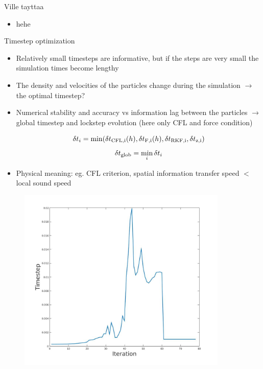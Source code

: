 \documentclass{beamer}
\begin{document}
\begin{frame}{Ville tayttaa}
\begin{itemize}

\item hehe

\end{itemize}
\end{frame}




\begin{frame}{Timestep optimization}
\begin{itemize}

\item Relatively small timesteps are informative, but if the steps are very small the simulation times become lengthy
\item The density and velocities of the particles change during the simulation $\rightarrow$ the optimal timestep?
\item Numerical stability and accuracy vs information lag between the particles $\rightarrow$ global timestep and lockstep evolution (here only CFL and force condition)

\begin{equation}
\delta t_{i} = \min(\delta t_{\rm CFL,i}(h),\delta t_{\rm F,i}(h),\delta t_{\rm RKF,i},\delta t_{\rm 
z,i})
\end{equation}
\begin{equation}
\delta t_{\rm glob} = \min_i{\delta t_i}
\end{equation}

\item Physical meaning: eg. CFL criterion, spatial information transfer speed $<$ local sound speed

\end{itemize}
\end{frame}

\begin{figure}[!ht]
\begin{center}
\includegraphics[width=10cm]{tStep_behaviour.jpg} 

\end{center}
\end{figure}
\end{document}
